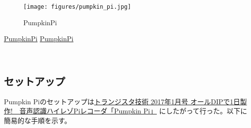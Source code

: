 \begin{figure}
\centering
\texttt{[image: figures/pumpkin\_pi.jpg]}
\caption{PumpkinPi}
\end{figure}

\href{http://select.marutsu.co.jp/list/detail.php?id=258}{PumpkinPi}
\href{https://www.marutsu.co.jp/pc/i/833515/}{PumpkinPi}

\
\subsection{セットアップ}\label{adc-setup}

Pumpkin
Piのセットアップは\href{https://toragi.cqpub.co.jp/tabid/829/Default.aspx}{トランジスタ技術
2017年1月号 オールDIPで1日製作!　音声認識ハイレゾPiレコーダ「Pumpkin
Pi」} にしたがって行った。以下に簡易的な手順を示す。

